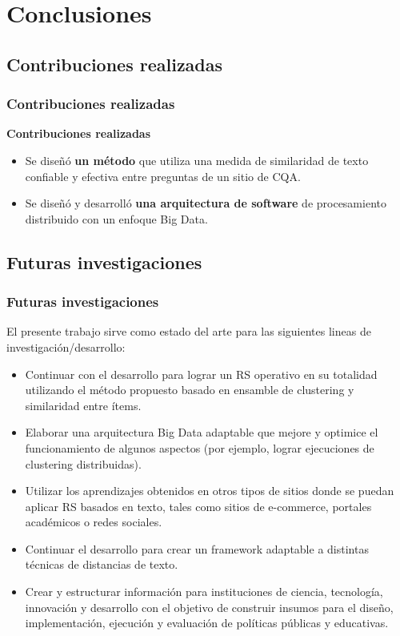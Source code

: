 \section{Conclusiones}

\subsection{Contribuciones realizadas}
\begin{frame}
	\frametitle{Contribuciones realizadas}
	\textbf{Contribuciones realizadas}
	\bigskip

	\begin{itemize}
		\item Se diseñó \textbf{un método} que utiliza una medida de similaridad de texto confiable y efectiva entre preguntas de un sitio de CQA.
		\bigskip
		\item Se diseñó y desarrolló \textbf{una arquitectura de software} de procesamiento distribuido con un enfoque Big Data.
	\end{itemize}
\end{frame}

\subsection{Futuras investigaciones}
\begin{frame}
	\frametitle{Futuras investigaciones}
	El presente trabajo sirve como estado del arte para las siguientes lineas de investigación/desarrollo:
	\bigskip

	\begin{footnotesize}
		\footnotesize
			\begin{itemize}
				\item Continuar con el desarrollo para lograr un RS operativo en su totalidad utilizando el método propuesto basado en ensamble de clustering y similaridad entre ítems.
				\item Elaborar una arquitectura Big Data adaptable que mejore y optimice el funcionamiento de algunos aspectos (por ejemplo, lograr ejecuciones de clustering distribuidas).
				\item Utilizar los aprendizajes obtenidos en otros tipos de sitios donde se puedan aplicar RS basados en texto, tales como sitios de e-commerce, portales académicos o redes sociales.
				\item Continuar el desarrollo para crear un framework adaptable a distintas técnicas de distancias de texto.
				\item Crear y estructurar información para instituciones de ciencia, tecnología, innovación y desarrollo con el objetivo de construir insumos para el diseño, implementación, ejecución y evaluación de políticas públicas y educativas.
			\end{itemize}
	\end{footnotesize}
\end{frame}